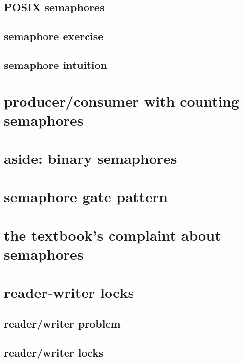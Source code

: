

\subsection{POSIX semaphores}



\subsection{semaphore exercise}


\subsection{semaphore intuition}


\section{producer/consumer with counting semaphores}


\section{aside: binary semaphores}


\section{semaphore gate pattern}


\section{the textbook's complaint about semaphores}


\section{reader-writer locks}

\subsection{reader/writer problem}



\subsection{reader/writer locks}

